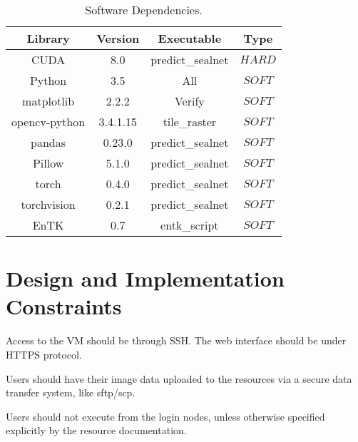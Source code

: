 \documentclass{scrreprt}
\begin{document}
\begin{table}
	\centering
	\begin{tabular}{|c|c|c|c|}
		\hline
		Library & Version & Executable & Type\\\hline
		CUDA          & 8.0      & predict\_sealnet & $HARD$\\\hline
		Python        & 3.5      & All              & $SOFT$\\\hline
		matplotlib    & 2.2.2    & Verify           & $SOFT$ \\\hline
		opencv-python & 3.4.1.15 & tile\_raster     & $SOFT$ \\\hline
		pandas        & 0.23.0   & predict\_sealnet & $SOFT$ \\\hline
		Pillow        & 5.1.0    & predict\_sealnet & $SOFT$ \\\hline
		torch         & 0.4.0    & predict\_sealnet & $SOFT$ \\\hline
		torchvision   & 0.2.1    & predict\_sealnet & $SOFT$ \\\hline
		EnTK          & 0.7      & entk\_script     & $SOFT$ \\\hline
		\hline
	\end{tabular}
	\caption{Software Dependencies.\label{tab:software_dependencies}}
\end{table}


\section{Design and Implementation Constraints}
\iffalse
$<$Describe any items or issues that will limit the options available to the 
developers. These might include: corporate or regulatory policies; hardware 
limitations (timing requirements, memory requirements); interfaces to other 
applications; specific technologies, tools, and databases to be used; parallel 
operations; language requirements; communications protocols; security 
considerations; design conventions or programming standards (for example, if the 
customer’s organization will be responsible for maintaining the delivered 
software).$>$
\fi

Access to the VM should be through SSH. The web interface should be under HTTPS 
protocol.

Users should have their image data uploaded to the resources via a secure data 
transfer system, like sftp/scp.

Users should not execute from the login nodes, unless otherwise specified explicitly 
by the resource documentation.
\end{document}
